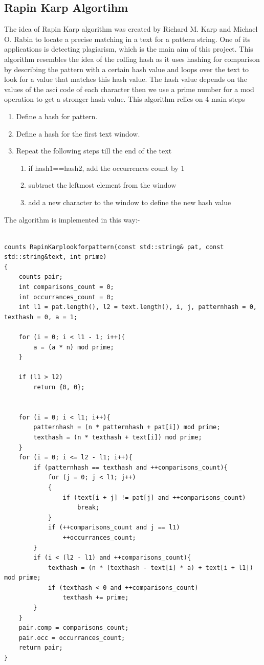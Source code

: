 \documentclass{article}
\theoremstyle{plain}
\begin{document}
\subsection*{Rapin Karp Algortihm}
The idea of Rapin Karp algorithm was created by  Richard M. Karp and Michael O. Rabin to locate a precise matching in a text for a pattern string. One of its applications is detecting plagiarism, which is the main aim of this project. This algorithm resembles the idea of the rolling hash as it uses hashing for comparison by describing the pattern with a certain hash value and loops over the text to look for a value that matches this hash value. The hash value depends on the values of the asci code of each character then we use a prime number for a mod operation to get a stronger hash value.
This algorithm relies on 4 main steps
\begin{enumerate}
    \item Define a hash for pattern.
    \item Define a hash for the first text window.
    \item Repeat the following steps till the end of the text
          \begin{enumerate}
              \item if hash1==hash2, add the occurrences count by 1
              \item subtract the leftmost element from the window
              \item add a new character to the window to define the new hash value
          \end{enumerate}


\end{enumerate}
The algorithm is implemented in this way:-
\begin{verbatim}
    
counts RapinKarplookforpattern(const std::string& pat, const std::string&text, int prime)
{
    counts pair;
    int comparisons_count = 0;
    int occurrances_count = 0;
    int l1 = pat.length(), l2 = text.length(), i, j, patternhash = 0, texthash = 0, a = 1;
    
    for (i = 0; i < l1 - 1; i++){
        a = (a * n) mod prime;
    }
    
    if (l1 > l2)
        return {0, 0};
    
    
    for (i = 0; i < l1; i++){
        patternhash = (n * patternhash + pat[i]) mod prime;
        texthash = (n * texthash + text[i]) mod prime;
    }
    for (i = 0; i <= l2 - l1; i++){
        if (patternhash == texthash and ++comparisons_count){
            for (j = 0; j < l1; j++)
            {                
                if (text[i + j] != pat[j] and ++comparisons_count)    
                    break;
            }
            if (++comparisons_count and j == l1)
                ++occurrances_count;
        }
        if (i < (l2 - l1) and ++comparisons_count){
            texthash = (n * (texthash - text[i] * a) + text[i + l1]) mod prime;
            if (texthash < 0 and ++comparisons_count)
                texthash += prime;
        }
    }
    pair.comp = comparisons_count;
    pair.occ = occurrances_count;
    return pair;
}
\end{verbatim}
\end{document}
